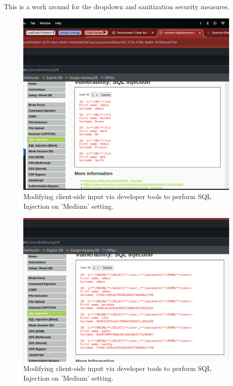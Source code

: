 \documentclass[12pt]{article}
\begin{document}
This is a work around for the dropdown and sanitization security measures. 

\begin{figure}[H]
    \centering
    \includegraphics[width=1.0\textwidth]{Screenshot9.png}
    \caption{Modifying client-side input via developer tools to perform SQL Injection on 'Medium' setting.}
\end{figure}


\begin{figure}[H]
    \centering
    \includegraphics[width=1.0\textwidth]{Screenshot11.png}
    \caption{Modifying client-side input via developer tools to perform SQL Injection on 'Medium' setting.}
\end{figure}
\end{document}
